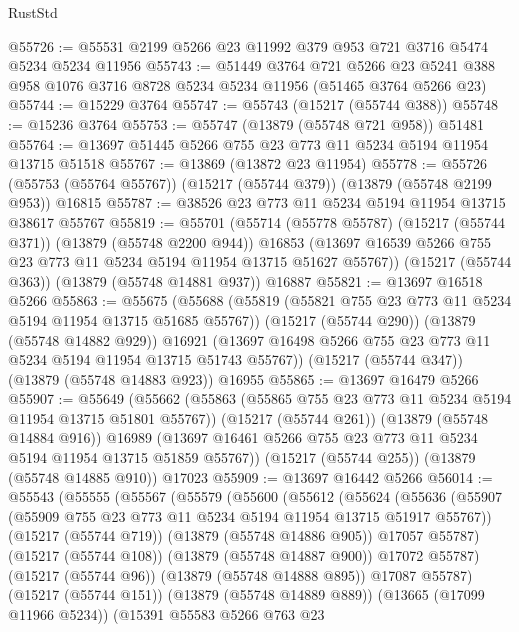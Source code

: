 \begin{lexlean}{RustStd}
\begin{coremodule}
@55726 := @55531 @2199 @5266 @23 @11992 @379 @953 @721 @3716 @5474 @5234 @5234 @11956
@55743 := @51449
    @3764
    @721
    @5266
    @23
    @5241
    @388
    @958
    @1076
    @3716
    @8728
    @5234
    @5234
    @11956
    (@51465 @3764 @5266 @23)
@55744 := @15229 @3764
@55747 := @55743 (@15217 (@55744 @388))
@55748 := @15236 @3764
@55753 := @55747 (@13879 (@55748 @721 @958)) @51481
@55764 := @13697 @51445 @5266 @755 @23 @773 @11 @5234 @5194 @11954 @13715 @51518
@55767 := @13869 (@13872 @23 @11954)
@55778 := @55726 (@55753 (@55764 @55767)) (@15217 (@55744 @379)) (@13879 (@55748 @2199 @953)) @16815
@55787 := @38526 @23 @773 @11 @5234 @5194 @11954 @13715 @38617 @55767
@55819 := @55701
    (@55714
      (@55778 @55787)
      (@15217 (@55744 @371))
      (@13879 (@55748 @2200 @944))
      @16853
      (@13697 @16539 @5266 @755 @23 @773 @11 @5234 @5194 @11954 @13715 @51627 @55767))
    (@15217 (@55744 @363))
    (@13879 (@55748 @14881 @937))
    @16887
@55821 := @13697 @16518 @5266
@55863 := @55675
    (@55688
      (@55819 (@55821 @755 @23 @773 @11 @5234 @5194 @11954 @13715 @51685 @55767))
      (@15217 (@55744 @290))
      (@13879 (@55748 @14882 @929))
      @16921
      (@13697 @16498 @5266 @755 @23 @773 @11 @5234 @5194 @11954 @13715 @51743 @55767))
    (@15217 (@55744 @347))
    (@13879 (@55748 @14883 @923))
    @16955
@55865 := @13697 @16479 @5266
@55907 := @55649
    (@55662
      (@55863 (@55865 @755 @23 @773 @11 @5234 @5194 @11954 @13715 @51801 @55767))
      (@15217 (@55744 @261))
      (@13879 (@55748 @14884 @916))
      @16989
      (@13697 @16461 @5266 @755 @23 @773 @11 @5234 @5194 @11954 @13715 @51859 @55767))
    (@15217 (@55744 @255))
    (@13879 (@55748 @14885 @910))
    @17023
@55909 := @13697 @16442 @5266
@56014 := @55543
    (@55555
      (@55567
        (@55579
          (@55600
            (@55612
              (@55624
                (@55636
                  (@55907 (@55909 @755 @23 @773 @11 @5234 @5194 @11954 @13715 @51917 @55767))
                  (@15217 (@55744 @719))
                  (@13879 (@55748 @14886 @905))
                  @17057
                  @55787)
                (@15217 (@55744 @108))
                (@13879 (@55748 @14887 @900))
                @17072
                @55787)
              (@15217 (@55744 @96))
              (@13879 (@55748 @14888 @895))
              @17087
              @55787)
            (@15217 (@55744 @151))
            (@13879 (@55748 @14889 @889))
            (@13665 (@17099 @11966 @5234))
            (@15391
              @55583
              @5266
              @763
              @23

\end{coremodule}
\end{lexlean}
